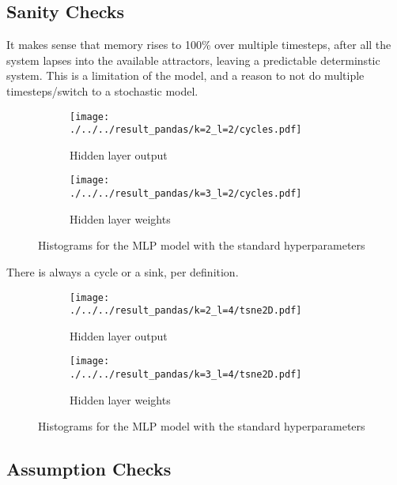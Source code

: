 \documentclass[../main.tex]{subfiles}
\begin{document}
\subsection{Sanity Checks}




It makes sense that memory  rises to 100\% over multiple timesteps, after all the system lapses into the available attractors, leaving a predictable determinstic system.
This is a limitation of the model, and a reason to not do multiple timesteps/switch to a stochastic model.

\begin{figure}[H]
    \centering
    \begin{subfigure}[b]{0.4\textwidth}
        \texttt{[image: ./../../result\_pandas/k=2\_l=2/cycles.pdf]}
        \caption{Hidden layer output}
    \end{subfigure}
    \begin{subfigure}[b]{0.4\textwidth}
        \texttt{[image: ./../../result\_pandas/k=3\_l=2/cycles.pdf]}
        \caption{Hidden layer weights}
    \end{subfigure}
    \caption{Histograms for the MLP model with the standard hyperparameters}
    \label{fig:regular_hid}
\end{figure}

There is always a cycle or a sink, per definition.

\begin{figure}[H]
    \centering
    \begin{subfigure}[b]{0.4\textwidth}
        \texttt{[image: ./../../result\_pandas/k=2\_l=4/tsne2D.pdf]}
        \caption{Hidden layer output}
    \end{subfigure}
    \begin{subfigure}[b]{0.4\textwidth}
        \texttt{[image: ./../../result\_pandas/k=3\_l=4/tsne2D.pdf]}
        \caption{Hidden layer weights}
    \end{subfigure}
    \caption{Histograms for the MLP model with the standard hyperparameters}
    \label{fig:regular_hid}
\end{figure}

\subsection{Assumption Checks}
\end{document}
